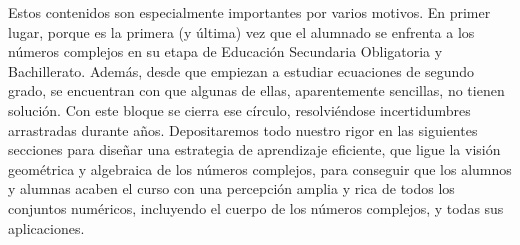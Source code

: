 \documentclass[../main.tex]{book}
\begin{document}
Estos contenidos son especialmente importantes por varios motivos. En primer lugar, porque es la primera (y última) vez que el alumnado se enfrenta a los números complejos en su etapa de Educación Secundaria Obligatoria y Bachillerato. Además, desde que empiezan a estudiar ecuaciones de segundo grado, se encuentran con que algunas de ellas, aparentemente sencillas, no tienen solución. Con este bloque se cierra ese círculo, resolviéndose incertidumbres arrastradas durante años. Depositaremos todo nuestro rigor en las siguientes secciones para diseñar una estrategia de aprendizaje eficiente, que ligue la visión geométrica y algebraica de los números complejos, para conseguir que los alumnos y alumnas acaben el curso con una percepción amplia y rica de todos los conjuntos numéricos, incluyendo el cuerpo de los números complejos, y todas sus aplicaciones.
\end{document}
